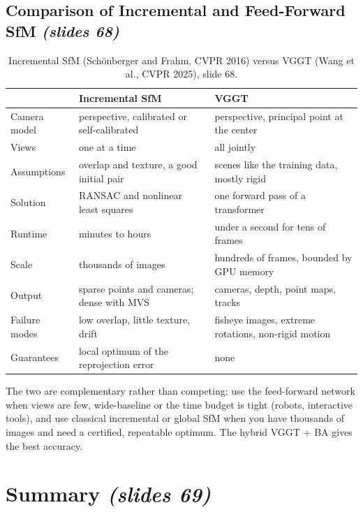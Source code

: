 \documentclass[11pt,a4paper]{article}
\newcommand{\slr}[1]{\texorpdfstring{\emph{(slides #1)}}{(slides #1)}}
\begin{document}
\subsection{Comparison of Incremental and Feed-Forward SfM \slr{68}}
\begin{table}[H]
\centering
\small
\begin{tabular}{@{}p{2.6cm}p{5.8cm}p{5.8cm}@{}}
\toprule
 & Incremental SfM & VGGT\\
\midrule
Camera model & perspective, calibrated or self-calibrated & perspective, principal point at the center\\
Views & one at a time & all jointly\\
Assumptions & overlap and texture, a good initial pair & scenes like the training data, mostly rigid\\
Solution & RANSAC and nonlinear least squares & one forward pass of a transformer\\
Runtime & minutes to hours & under a second for tens of frames\\
Scale & thousands of images & hundreds of frames, bounded by GPU memory\\
Output & sparse points and cameras; dense with MVS & cameras, depth, point maps, tracks\\
Failure modes & low overlap, little texture, drift & fisheye images, extreme rotations, non-rigid motion\\
Guarantees & local optimum of the reprojection error & none\\
\bottomrule
\end{tabular}
\caption{Incremental SfM (Sch\"onberger and Frahm, CVPR 2016) versus VGGT (Wang et al., CVPR 2025), slide 68.}
\end{table}

\begin{intuition}
The two are complementary rather than competing: use the feed-forward network when views are few, wide-baseline or the time budget is tight (robots, interactive tools), and use classical incremental or global SfM when you have thousands of images and need a certified, repeatable optimum. The hybrid VGGT + BA gives the best accuracy.
\end{intuition}

\section*{Summary \slr{69}}
\end{document}
